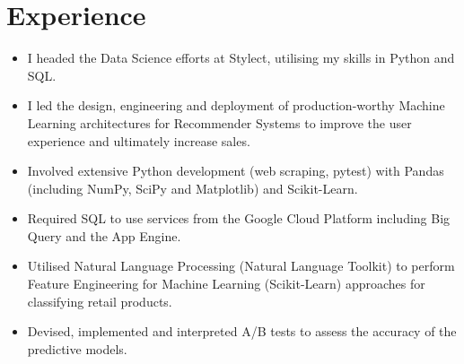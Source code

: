 \documentclass[11pt,a4paper,sans]{moderncv}        %
\begin{document}
\section{Experience}
\vspace*{-0.15cm}
{
\begin{itemize}%
\item I headed the Data Science efforts at Stylect, utilising my skills in Python and SQL.
\item I led the design, engineering and deployment of production-worthy Machine Learning architectures for Recommender Systems to improve the user experience and ultimately increase sales.
\item Involved extensive Python development (web scraping, pytest) with Pandas (including NumPy, SciPy and Matplotlib) and Scikit-Learn.
\item Required SQL to use services from the Google Cloud Platform including Big Query and the App Engine.
\item Utilised Natural Language Processing (Natural Language Toolkit) to perform Feature Engineering for Machine Learning (Scikit-Learn) approaches for classifying retail products.
\item Devised, implemented and interpreted A/B tests to assess the accuracy of the predictive models.
\end{itemize}
}
\vspace*{-0.15cm}
\end{document}
